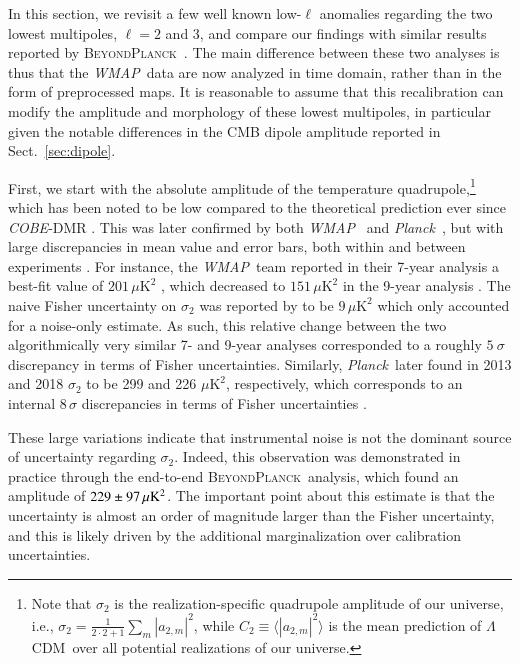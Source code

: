\documentclass[twocolumn]{../../common/aa}
\def\WMAP{\emph{WMAP}}
\def\COBE{\emph{COBE}}
\def\planck{\emph{Planck}}
\def\Planck{\emph{Planck}}
\def\LCDM{$\Lambda$CDM}
\newcommand{\bp}{\textsc{BeyondPlanck}}
\begin{document}
In this section, we revisit a few well known low-$\ell$ anomalies regarding the two lowest multipoles, $\ell=2$ and 3, and compare our findings with similar results reported by \bp\ \citep{bp11}. The main difference between these two analyses is thus that the \WMAP\ data are now analyzed in time domain, rather than in the form of preprocessed maps. It is reasonable to assume that this recalibration can modify the amplitude and morphology of these lowest multipoles, in particular given the notable differences in the CMB dipole amplitude reported in Sect.~\ref{sec:dipole}.


First, we start with the absolute amplitude of the temperature quadrupole,\footnote{Note that $\sigma_2$ is the realization-specific quadrupole amplitude of our universe, i.e., $\sigma_2=\tfrac1{2\cdot2+1}\sum_m|a_{2,m}|^2$, while $C_2\equiv\langle |a_{2,m}|^2\rangle$ is the mean prediction of \LCDM\ over all potential realizations of our universe.} which has been noted to be low compared to the theoretical prediction ever since \COBE-DMR \citep{bennett:1992}. This was later confirmed by both \WMAP\ \citep{hinshaw2003a} and \planck\ \citep{planck2013-XV}, but with large discrepancies in mean value and error bars, both within and between experiments \citep{bp11}. For instance, the \WMAP\ team reported in their 7-year analysis a best-fit value of $201\,\mu\mathrm{K}^2$ \citep{larson2010}, which decreased to $151\,\mu\mathrm{K}^2$ in the 9-year analysis \citep{hinshaw2012}. The naive Fisher uncertainty on $\sigma_2$ was reported by \citet{hinshaw2012} to be $9\,\mu \mathrm{K}^2$ which only accounted for a noise-only estimate. As such, this relative change between the two algorithmically very similar 7- and 9-year analyses corresponded to a roughly $5~\sigma$ discrepancy in terms of Fisher uncertainties. Similarly, \Planck\ later found in 2013 and 2018 $\sigma_2$ to be 299 and 226 $\mu \mathrm{K}^2$, respectively, which corresponds to an internal $8\,\sigma$ discrepancies in terms of Fisher uncertainties \citep{planck2016-l05}.

These large variations indicate that instrumental noise is not the dominant source of uncertainty regarding $\sigma_2$. Indeed, this observation was demonstrated in practice through the end-to-end \bp\ analysis, which found an amplitude of $229\pm97\muK^2$. The important point about this estimate is that the uncertainty is almost an order of magnitude larger than the Fisher uncertainty, and this is likely driven by the additional marginalization over calibration uncertainties. 
\end{document}
